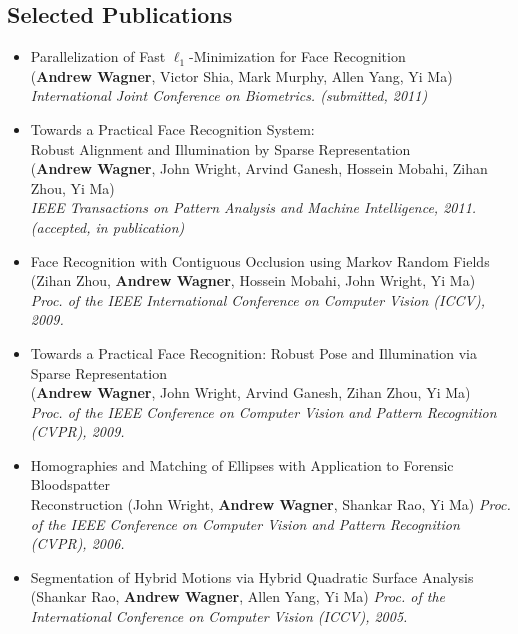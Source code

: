 \documentclass[line]{res}
\def\spaceline{\vspace{1mm} \fullline}
\begin{document}
\begin{resume}
\section{Selected Publications}
\begin{itemize}
\item 
\spaceline
Parallelization of Fast $\ell_1$-Minimization for Face Recognition\\
		({\bf Andrew Wagner}, Victor Shia, Mark Murphy, Allen Yang, Yi Ma) \\
{ \it International Joint Conference on Biometrics. (submitted, 2011) }
\item 
Towards a Practical Face Recognition System: \\Robust Alignment and Illumination by Sparse Representation \\
		({\bf Andrew Wagner}, John Wright, Arvind Ganesh, Hossein Mobahi, Zihan Zhou, Yi Ma) \\
{ \it IEEE Transactions on Pattern Analysis and Machine Intelligence, 2011. (accepted, in publication) }
\item
		Face Recognition with Contiguous Occlusion using Markov Random Fields \\
			(Zihan Zhou, {\bf Andrew Wagner}, Hossein Mobahi, John Wright, Yi Ma) \\
{\it Proc. of the IEEE International Conference on Computer Vision (ICCV), 2009.}
\item Towards a Practical Face Recognition: Robust Pose and Illumination via Sparse Representation \\
		({\bf Andrew Wagner}, John Wright, Arvind Ganesh, Zihan Zhou, Yi Ma) \\
{ \it Proc. of the IEEE Conference on Computer Vision and Pattern Recognition (CVPR), 2009. }
\item Homographies and Matching of Ellipses with Application to Forensic Bloodspatter \\
	Reconstruction 
(John Wright, {\bf Andrew Wagner}, {Shankar Rao},  Yi Ma) 
{\it Proc. of the IEEE Conference on Computer Vision and Pattern Recognition (CVPR), 2006.}
\item Segmentation of Hybrid Motions via Hybrid Quadratic Surface Analysis ({Shankar Rao}, {\bf Andrew Wagner}, Allen Yang, Yi Ma) {\it Proc. of the International Conference on Computer Vision (ICCV), 2005.}

\end{itemize}
\end{resume}
\end{document}
